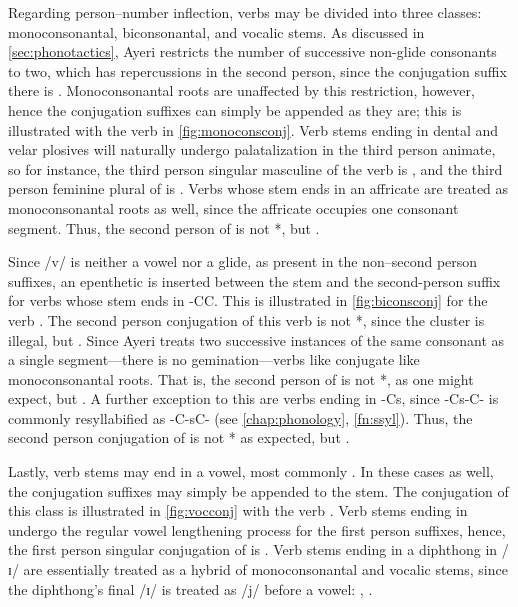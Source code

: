 Regarding person--number inflection, verbs may be divided into three classes: 
monoconsonantal, biconsonantal, and vocalic stems. As discussed in 
\autoref{sec:phonotactics}, Ayeri restricts the number of successive non-glide 
consonants to two, which has repercussions in the second person, since the 
conjugation suffix there is . Monoconsonantal roots are unaffected 
by this restriction, however, hence the conjugation suffixes can simply be 
appended as they are; this is illustrated with the verb 
 in \autoref{fig:monoconsconj}. Verb stems 
ending in dental and velar plosives will naturally undergo palatalization in 
the third person animate, so for instance, the third person singular masculine 
of the verb  is , and the third person feminine plural of  is . Verbs whose 
stem ends in an affricate are treated as monoconsonantal roots as well, since 
the affricate occupies one consonant segment. Thus, the second person of 
 is not *, but 
.

Since /v/ is neither a vowel nor a glide, as present in the non–second 
person suffixes, an epenthetic  is inserted between the stem and 
the second-person suffix for verbs whose stem ends in -CC. This is illustrated 
in \autoref{fig:biconsconj} for the verb . The 
second person conjugation of this verb is not *, since 
the cluster  is illegal, but . Since Ayeri 
treats two successive instances of the same consonant as a single 
segment---there is no gemination---verbs like  
conjugate like monoconsonantal roots. That is, the second person of 
 is not *, as one might expect, but 
. A further exception to this are verbs ending in -Cs, 
since -Cs-C- is commonly resyllabified as -C-sC- (see \autoref{chap:phonology}, 
\autoref{fn:ssyl}). Thus, the second person conjugation of 
 is not * as expected, but 
.

Lastly, verb stems may end in a vowel, most commonly . In these cases as 
well, the conjugation suffixes may simply be appended to the stem. The 
conjugation of this class is illustrated in \autoref{fig:vocconj} with the verb 
. Verb stems ending in  undergo the regular vowel 
lengthening process for the first person suffixes, hence, the first person 
singular conjugation of  is . 
Verb stems ending in a diphthong in /ɪ/ are essentially treated as a hybrid of 
monoconsonantal and vocalic stems, since the diphthong's final /ɪ/ is treated as 
/j/ before a vowel: , .

